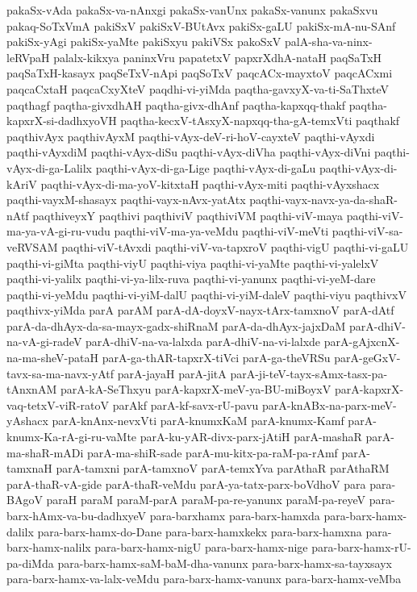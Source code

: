 {pakaSx-vAda
pakaSx-va-nAnxgi
pakaSx-vanUnx
pakaSx-vanunx
pakaSxvu
pakaq-SoTxVmA
pakiSxV
pakiSxV-BUtAvx
pakiSx-gaLU
pakiSx-mA-nu-SAnf
pakiSx-yAgi
pakiSx-yaMte
pakiSxyu
pakiVSx
pakoSxV
palA-sha-va-ninx-leRVpaH
palalx-kikxya
paninxVru
papatetxV
papxrXdhA-nataH
paqSaTxH
paqSaTxH-kasayx
paqSeTxV-nApi
paqSoTxV
paqcACx-mayxtoV
paqcACxmi
paqcaCxtaH
paqcaCxyXteV
paqdhi-vi-yiMda
paqtha-gavxyX-va-ti-SaThxteV
paqthagf
paqtha-givxdhAH
paqtha-givx-dhAnf
paqtha-kapxqq-thakf
paqtha-kapxrX-si-dadhxyoVH
paqtha-kecxV-tAsxyX-napxqq-tha-gA-temxVti
paqthakf
paqthivAyx
paqthivAyxM
paqthi-vAyx-deV-ri-hoV-cayxteV
paqthi-vAyxdi
paqthi-vAyxdiM
paqthi-vAyx-diSu
paqthi-vAyx-diVha
paqthi-vAyx-diVni
paqthi-vAyx-di-ga-Lalilx
paqthi-vAyx-di-ga-Lige
paqthi-vAyx-di-gaLu
paqthi-vAyx-di-kAriV
paqthi-vAyx-di-ma-yoV-kitxtaH
paqthi-vAyx-miti
paqthi-vAyxshacx
paqthi-vayxM-shasayx
paqthi-vayx-nAvx-yatAtx
paqthi-vayx-navx-ya-da-shaR-nAtf
paqthiveyxY
paqthivi
paqthiviV
paqthiviVM
paqthi-viV-maya
paqthi-viV-ma-ya-vA-gi-ru-vudu
paqthi-viV-ma-ya-veMdu
paqthi-viV-meVti
paqthi-viV-sa-veRVSAM
paqthi-viV-tAvxdi
paqthi-viV-va-tapxroV
paqthi-vigU
paqthi-vi-gaLU
paqthi-vi-giMta
paqthi-viyU
paqthi-viya
paqthi-vi-yaMte
paqthi-vi-yalelxV
paqthi-vi-yalilx
paqthi-vi-ya-lilx-ruva
paqthi-vi-yanunx
paqthi-vi-yeM-dare
paqthi-vi-yeMdu
paqthi-vi-yiM-dalU
paqthi-vi-yiM-daleV
paqthi-viyu
paqthivxV
paqthivx-yiMda
parA
parAM
parA-dA-doyxV-nayx-tArx-tamxnoV
parA-dAtf
parA-da-dhAyx-da-sa-mayx-gadx-shiRnaM
parA-da-dhAyx-jajxDaM
parA-dhiV-na-vA-gi-radeV
parA-dhiV-na-va-lalxda
parA-dhiV-na-vi-lalxde
parA-gAjxcnX-na-ma-sheV-pataH
parA-ga-thAR-tapxrX-tiVci
parA-ga-theVRSu
parA-geGxV-tavx-sa-ma-navx-yAtf
parA-jayaH
parA-jitA
parA-ji-teV-tayx-sAmx-tasx-pa-tAnxnAM
parA-kA-SeThxyu
parA-kapxrX-meV-ya-BU-miBoyxV
parA-kapxrX-vaq-tetxV-viR-ratoV
parAkf
parA-kf-savx-rU-pavu
parA-knABx-na-parx-meV-yAshacx
parA-knAnx-nevxVti
parA-knumxKaM
parA-knumx-Kamf
parA-knumx-Ka-rA-gi-ru-vaMte
parA-ku-yAR-divx-parx-jAtiH
parA-mashaR
parA-ma-shaR-mADi
parA-ma-shiR-sade
parA-mu-kitx-pa-raM-pa-rAmf
parA-tamxnaH
parA-tamxni
parA-tamxnoV
parA-temxYva
parAthaR
parAthaRM
parA-thaR-vA-gide
parA-thaR-veMdu
parA-ya-tatx-parx-boVdhoV
para
para-BAgoV
paraH
paraM
paraM-parA
paraM-pa-re-yanunx
paraM-pa-reyeV
para-barx-hAmx-va-bu-dadhxyeV
para-barxhamx
para-barx-hamxda
para-barx-hamx-dalilx
para-barx-hamx-do-Dane
para-barx-hamxkekx
para-barx-hamxna
para-barx-hamx-nalilx
para-barx-hamx-nigU
para-barx-hamx-nige
para-barx-hamx-rU-pa-diMda
para-barx-hamx-saM-baM-dha-vanunx
para-barx-hamx-sa-tayxsayx
para-barx-hamx-va-lalx-veMdu
para-barx-hamx-vanunx
para-barx-hamx-veMba
}
